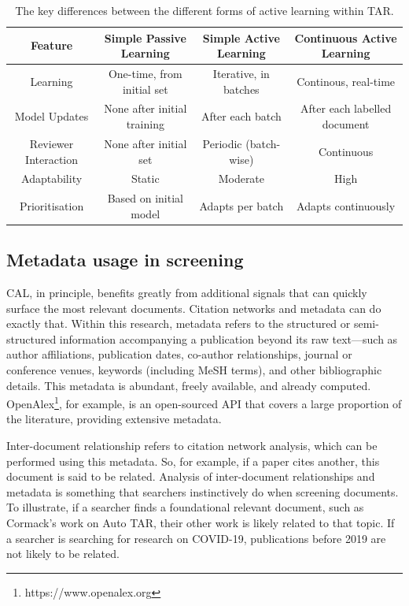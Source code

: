 \documentclass[10pt,oneside]{book}
\begin{document}
\begin{table}[t]

    \centering
    \footnotesize
    \begin{tabular}{|c|c|c|c|}
        \hline
        \textbf{Feature} & \textbf{Simple Passive Learning} & \textbf{Simple Active Learning} & \textbf{Continuous Active Learning} \\
        \hline
        Learning & One-time, from initial set  & Iterative, in batches  & Continous, real-time \\
        \hline
        Model Updates & None after initial training & After each batch & After each labelled document \\
        \hline
        Reviewer Interaction & None after initial set & Periodic (batch-wise) & Continuous \\
        \hline
        Adaptability & Static  & Moderate & High \\
        \hline
        Prioritisation & Based on initial model & Adapts per batch & Adapts continuously \\
        \hline
    \end{tabular}
    \caption{The key differences between the different forms of active learning within TAR.}
    \label{tab:differences_in_tar}
\end{table}



\subsection{Metadata usage in screening}

CAL, in principle, benefits greatly from additional signals that can quickly surface the most relevant documents. Citation networks and metadata can do exactly that. Within this research, metadata refers to the structured or semi-structured information accompanying a publication beyond its raw text—such as author affiliations, publication dates, co-author relationships, journal or conference venues, keywords (including MeSH terms), and other bibliographic details. This metadata is abundant, freely available, and already computed. OpenAlex\footnote{https://www.openalex.org}, for example, is an open-sourced API that covers a large proportion of the literature, providing extensive metadata.

Inter-document relationship refers to citation network analysis, which can be performed using this metadata. So, for example, if a paper cites another, this document is said to be related. Analysis of inter-document relationships and metadata is something that searchers instinctively do when screening documents. To illustrate, if a searcher finds a foundational relevant document, such as Cormack's work on Auto TAR, their other work is likely related to that topic. If a searcher is searching for research on COVID-19, publications before 2019 are not likely to be related. 
\end{document}
